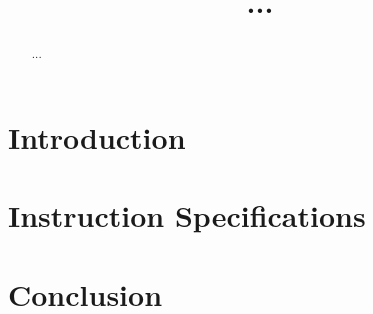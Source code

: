 \documentclass[submission]{iacrtrans}
\title{...}
\author{}
\institute{}
\author{}
\institute{}
\begin{document}

\maketitle

\begin{abstract}
...
\end{abstract}


\tableofcontents

\section{Introduction}
\label{sec:intro}



\section{Instruction Specifications}
\label{sec:instr:specs}



\section{Conclusion}
\label{sec:outro}






\end{document}
